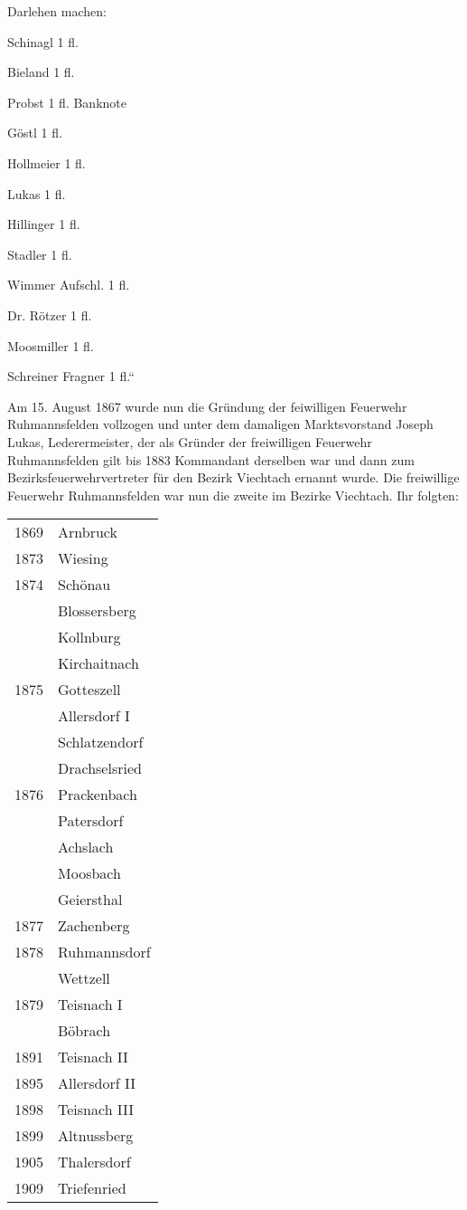 \documentclass[12pt,a4paper]{book}
\begin{document}
Darlehen machen:

\begin{compactitem}
\item Schinagl 1 fl.
\item Bieland 1 fl.
\item Probst 1 fl. Banknote
\item Göstl 1 fl.
\item Hollmeier 1 fl.
\item Lukas 1 fl.
\item Hillinger 1 fl.
\item Stadler 1 fl.
\item Wimmer Aufschl. 1 fl.
\item Dr. Rötzer 1 fl.
\item Moosmiller 1 fl.
\item Schreiner Fragner 1 fl.“
\end{compactitem}

Am 15. August 1867 wurde nun die Gründung der feiwilligen Feuerwehr
Ruhmannsfelden vollzogen und unter dem damaligen Marktsvorstand Joseph Lukas,
Lederermeister, der als Gründer der freiwilligen Feuerwehr Ruhmannsfelden gilt
bis 1883 Kommandant derselben war und dann zum Bezirksfeuerwehrvertreter für den
Bezirk Viechtach ernannt wurde. Die freiwillige Feuerwehr Ruhmannsfelden war nun
die zweite im Bezirke Viechtach. Ihr folgten:

\begin{tabular}{ll}
1869 & Arnbruck\\
1873 & Wiesing\\
1874 & Schönau\\
& Blossersberg\\
& Kollnburg\\
& Kirchaitnach\\
1875 & Gotteszell\\
& Allersdorf I\\
& Schlatzendorf\\
& Drachselsried\\
1876 & Prackenbach\\
& Patersdorf\\
& Achslach\\
& Moosbach\\
& Geiersthal\\
1877 & Zachenberg\\
1878 & Ruhmannsdorf\\
& Wettzell\\
1879 & Teisnach I\\
& Böbrach\\
1891 & Teisnach II\\
1895 & Allersdorf II\\
1898 & Teisnach III\\
1899 & Altnussberg\\
1905 & Thalersdorf\\
1909 & Triefenried\\
\end{tabular}
\end{document}
